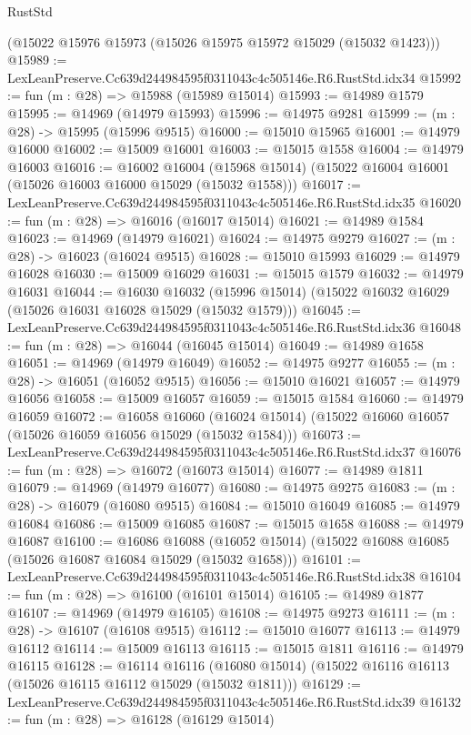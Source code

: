 \begin{lexlean}{RustStd}
\begin{coremodule}
    (@15022 @15976 @15973 (@15026 @15975 @15972 @15029 (@15032 @1423)))
@15989 := LexLeanPreserve.Cc639d244984595f0311043c4c505146e.R6.RustStd.idx34
@15992 := fun (m : @28) => @15988 (@15989 @15014)
@15993 := @14989 @1579
@15995 := @14969 (@14979 @15993)
@15996 := @14975 @9281
@15999 := (m : @28) -> @15995 (@15996 @9515)
@16000 := @15010 @15965
@16001 := @14979 @16000
@16002 := @15009 @16001
@16003 := @15015 @1558
@16004 := @14979 @16003
@16016 := @16002
    @16004
    (@15968 @15014)
    (@15022 @16004 @16001 (@15026 @16003 @16000 @15029 (@15032 @1558)))
@16017 := LexLeanPreserve.Cc639d244984595f0311043c4c505146e.R6.RustStd.idx35
@16020 := fun (m : @28) => @16016 (@16017 @15014)
@16021 := @14989 @1584
@16023 := @14969 (@14979 @16021)
@16024 := @14975 @9279
@16027 := (m : @28) -> @16023 (@16024 @9515)
@16028 := @15010 @15993
@16029 := @14979 @16028
@16030 := @15009 @16029
@16031 := @15015 @1579
@16032 := @14979 @16031
@16044 := @16030
    @16032
    (@15996 @15014)
    (@15022 @16032 @16029 (@15026 @16031 @16028 @15029 (@15032 @1579)))
@16045 := LexLeanPreserve.Cc639d244984595f0311043c4c505146e.R6.RustStd.idx36
@16048 := fun (m : @28) => @16044 (@16045 @15014)
@16049 := @14989 @1658
@16051 := @14969 (@14979 @16049)
@16052 := @14975 @9277
@16055 := (m : @28) -> @16051 (@16052 @9515)
@16056 := @15010 @16021
@16057 := @14979 @16056
@16058 := @15009 @16057
@16059 := @15015 @1584
@16060 := @14979 @16059
@16072 := @16058
    @16060
    (@16024 @15014)
    (@15022 @16060 @16057 (@15026 @16059 @16056 @15029 (@15032 @1584)))
@16073 := LexLeanPreserve.Cc639d244984595f0311043c4c505146e.R6.RustStd.idx37
@16076 := fun (m : @28) => @16072 (@16073 @15014)
@16077 := @14989 @1811
@16079 := @14969 (@14979 @16077)
@16080 := @14975 @9275
@16083 := (m : @28) -> @16079 (@16080 @9515)
@16084 := @15010 @16049
@16085 := @14979 @16084
@16086 := @15009 @16085
@16087 := @15015 @1658
@16088 := @14979 @16087
@16100 := @16086
    @16088
    (@16052 @15014)
    (@15022 @16088 @16085 (@15026 @16087 @16084 @15029 (@15032 @1658)))
@16101 := LexLeanPreserve.Cc639d244984595f0311043c4c505146e.R6.RustStd.idx38
@16104 := fun (m : @28) => @16100 (@16101 @15014)
@16105 := @14989 @1877
@16107 := @14969 (@14979 @16105)
@16108 := @14975 @9273
@16111 := (m : @28) -> @16107 (@16108 @9515)
@16112 := @15010 @16077
@16113 := @14979 @16112
@16114 := @15009 @16113
@16115 := @15015 @1811
@16116 := @14979 @16115
@16128 := @16114
    @16116
    (@16080 @15014)
    (@15022 @16116 @16113 (@15026 @16115 @16112 @15029 (@15032 @1811)))
@16129 := LexLeanPreserve.Cc639d244984595f0311043c4c505146e.R6.RustStd.idx39
@16132 := fun (m : @28) => @16128 (@16129 @15014)

\end{coremodule}
\end{lexlean}
